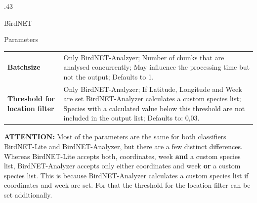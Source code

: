 \documentclass[final]{beamer}
\begin{document}
\begin{frame}[fragile]{}
\begin{columns}[t]
\begin{column}{.43\linewidth}
\begin{block}{BirdNET}
\begin{subblock}{Parameters}
{\begin{tabular}{p{7em}p{25em}}
\textbf{Batchsize} & Only BirdNET-Analzyer; Number of chunks that are analysed concurrently; May influence the processing time but not the output; Defaults to 1.\\
\textbf{Threshold for location filter} & Only BirdNET-Analyzer; If Latitude, Longitude and Week are set BirdNET-Analyzer calculates a custom species list; Species with a calculated value below this \mbox{threshold} are not included in the output list; Defaults to: 0,03. \\
\end{tabular}
}
	\end{subblock}
	\textbf{ATTENTION:} Most of the parameters are the same for both classifiers BirdNET-Lite and BirdNET-Analyzer, but there are a few distinct differences.
	Whereas BirdNET-Lite accepts both, coordinates, week \textbf{and} a custom species list, BirdNET-Analyzer accepts only either coordinates and week \textbf{or} a custom species list.
	This is because BirdNET-Analyzer calculates a custom species list if coordinates and week are set.
	For that the threshold for the location filter can be set additionally.

\end{block}
      \end{column}
    \end{columns}
    \vfill
  \end{frame}
\end{document}
